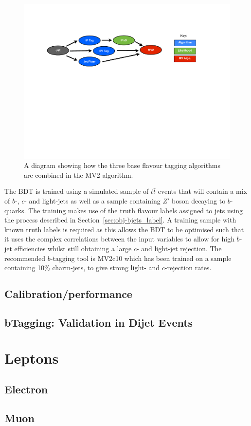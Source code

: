    \begin{figure}[!htb]
     \begin{center}
       \includegraphics[width=1.0\textwidth]{figs/Objects/MV2_schem.pdf}
       \caption{A diagram showing how the three base flavour tagging algorithms are combined in the MV2 algorithm.}
       \label{fig:obj-MV2_schem}
     \end{center}
     \vspace{-1cm}
   \end{figure}
   
   The BDT is trained using a simulated sample of $t\bar{t}$ events that will contain a mix of  $b$-, $c$- and light-jets
   as well as a sample containing $Z'$ boson decaying to $b$-quarks.
   The training makes use of the truth flavour labels assigned to jets using the process described in Section~\ref{sec:obj-bjets_label}.
   A training sample with known truth labels is required as this allows the BDT to be optimised
   such that it uses the complex correlations between the input variables to allow for high $b$-jet efficiencies
   whilst still obtaining a large $c$- and light-jet rejection.
   The recommended $b$-tagging tool is MV2c10 which has been trained on a sample containing 10\% charm-jets, to give strong light- and $c$-rejection rates.
   
 
   
   \subsection{Calibration/performance}
   \subsection{bTagging: Validation in Dijet Events}
    
  \section{Leptons}   
  \subsection{Electron}
  \label{sec:obj-electron}
  \subsection{Muon}
  \label{sec:obj-muon}
    
